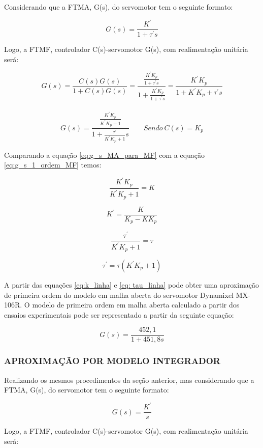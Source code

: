 \documentclass[12pt,oneside,a4paper, chapter=TITLE, section = TITLE, english, brazil]{abntex2}
\begin{document}
Considerando que a FTMA, G(s), do servomotor tem o seguinte formato:

$$G(s) = \frac{K^{'}}{1 + \tau^{'} s}$$

Logo, a FTMF, controlador C(s)-servomotor G(s), com realimentação unitária será:

$$G(s) = \frac{C(s)G(s)}{1 + C(s)G(s)} = \frac{\frac{K^{'} K_{p}}{1 + \tau^{'} s}}{1 + \frac{K^{'} K_{p}}{1 + \tau^{'} s}} = \frac{K^{'} K_{p}}{1 + K^{'} K_{p} + \tau^{'} s}$$
\\
\begin{equation}
G(s) = \frac{\frac{K^{'} K_{p}}{K^{'} K_{p} + 1}}{1 + \frac{\tau^{'}}{K^{'} K_{p} + 1} s} \label{eq:g_s_MA_para_MF} \qquad Sendo \ C(s) = K_{p}
\end{equation}

Comparando a equação \ref{eq:g_s_MA_para_MF} com a equação \ref{eq:g_s_1_ordem_MF} temos:

$$\frac{K^{'} K_{p}}{K^{'} K_{p} + 1} = K$$

\begin{equation}
K^{'} = \frac{K}{K_{p} - K K_{p}} \label{eq:k_linha}
\end{equation}

$$ \frac{\tau^{'}}{K^{'} K_{p} + 1} = \tau$$

\begin{equation}
\tau^{'} = \tau (K^{'} K_{p} + 1) \label{eq: tau_linha}
\end{equation}

A partir das equações \ref{eq:k_linha} e \ref{eq: tau_linha} pode obter uma aproximação de primeira ordem do modelo em malha aberta do servomotor Dynamixel MX-106R. O modelo de primeira ordem em malha aberta calculado a partir dos ensaios experimentais pode ser representado a partir da seguinte equação:

$$G(s) = \frac{452,1}{1 + 451,8 s}$$

\subsubsection{APROXIMAÇÃO POR MODELO INTEGRADOR} \label{sec:aprox_mod_int} %

Realizando os mesmos procedimentos da seção anterior, mas considerando que a FTMA, G(s), do servomotor tem o seguinte formato:

$$G(s) = \frac{K^{'}}{s}$$

Logo, a FTMF, controlador C(s)-servomotor G(s), com realimentação unitária será:
\end{document}
